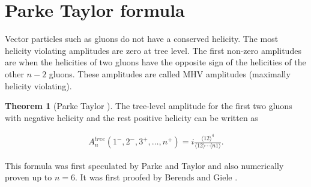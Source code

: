 \documentclass{article}
\theoremstyle{definition}
\newtheorem{theorem}{Theorem}[section]
\numberwithin{equation}{section}
\begin{document}
\section{Parke Taylor formula}
\label{sec:pt}

Vector particles such as gluons do not have a conserved helicity. The most helicity violating amplitudes are zero at tree level. The first non-zero amplitudes are when the helicities of two gluons have the opposite sign of the helicities of the other $n-2$ gluons. These amplitudes are called MHV amplitudes (maximally helicity violating).

\begin{theorem}[Parke Taylor \cite{pt86}]

The tree-level amplitude for the first two gluons with negative helicity and the rest positive helicity can be written as

\begin{align}
    A_n^{tree}(1^{-}, 2^{-}, 3^{+}, \dots , n^{+}) = i \frac{\langle 12 \rangle^4}{\langle 12 \rangle \cdots \langle n1 \rangle}.
\end{align}

This formula was first speculated by Parke and Taylor and also numerically proven up to $n=6$. It was first proofed by Berends and Giele \cite{bg88recursive}.

\end{theorem}
\end{document}
